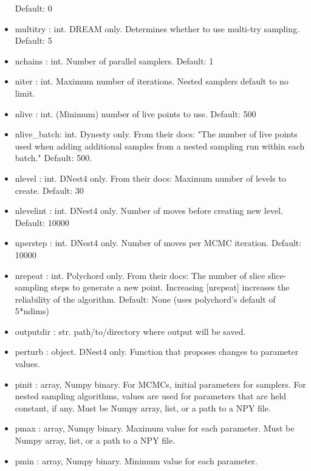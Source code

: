 \documentclass[letterpaper, 12pt]{article}
\begin{document}
\begin{itemize}
                      Default: 0
\item multitry : int. DREAM only. Determines whether to use multi-try sampling. 
                      Default: 5
\item nchains : int. Number of parallel samplers. Default: 1
\item niter : int. Maximum number of iterations.  Nested samplers  
                       default to no limit.
\item nlive : int. (Minimum) number of live points to use. Default: 500
\item nlive\_batch: int. Dynesty only. From their docs: "The number of  
                         live points used when adding additional  
                         samples from a nested sampling run within  
                         each batch."  Default: 500.
\item nlevel : int. DNest4 only. From their docs: Maximum number of levels to 
                    create.  Default: 30
\item nlevelint : int. DNest4 only. Number of moves before creating new level. 
                       Default: 10000
\item nperstep : int. DNest4 only. Number of moves per MCMC iteration.  
                      Default: 10000
\item nrepeat : int. Polychord only.  From their docs: The number of 
                     slice slice-sampling steps to generate a new 
                     point.  Increasing [nrepeat] increases the 
                     reliability of the algorithm.  Default: None 
                     (uses polychord's default of 5*ndims)
\item outputdir : str. path/to/directory where output will be saved.
\item perturb : object. DNest4 only. Function that proposes changes to 
                        parameter values.
\item pinit : array, Numpy binary. For MCMCs, initial parameters for  
                            samplers.  For nested sampling algorithms,  
                            values are used for parameters that are held  
                            constant, if any. 
                        Must be Numpy array, list, or a path to a NPY file.
\item pmax : array, Numpy binary. Maximum value for each parameter. 
                        Must be Numpy array, list, or a path to a NPY file.
\item pmin : array, Numpy binary. Minimum value for each parameter. 

\end{itemize}
\end{document}
